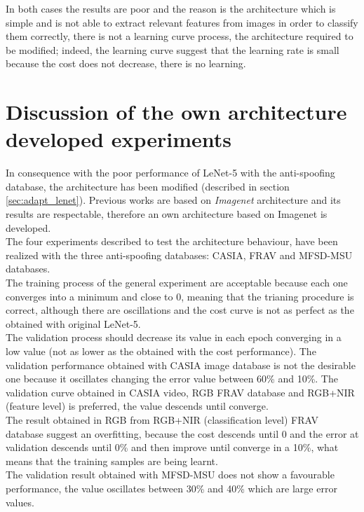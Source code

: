 In both cases the results are poor and the reason is the architecture which is simple and is not able to extract relevant features from images in order to classify them correctly, there is not a learning curve process, the architecture required to be modified; indeed, the learning curve suggest that the learning rate is small because the cost does not decrease, there is no learning.

\section{Discussion of the own architecture developed experiments}
In consequence with the poor performance of LeNet-5 with the anti-spoofing database, the architecture has been modified (described in section \ref{sec:adapt_lenet}). Previous works are based on \textit{Imagenet} architecture and its results are respectable, therefore an own architecture based on Imagenet is developed.\\

The four experiments described to test the architecture behaviour, have been realized with the three anti-spoofing databases: CASIA, FRAV and MFSD-MSU databases.\\

The training process of the general experiment are acceptable because each one converges into a minimum and close to 0, meaning that the trianing procedure is correct, although there are oscillations and the cost curve is not as perfect as the obtained with original LeNet-5.\\

The validation process should decrease its value in each epoch converging in a low value (not as lower as the obtained with the cost performance). The validation performance obtained with CASIA image database is not the desirable one because it oscillates changing the error value between 60\% and 10\%. The validation curve obtained in CASIA video, RGB FRAV database and RGB+NIR (feature level) is preferred, the value descends until converge.\\

The result obtained in RGB from RGB+NIR (classification level) FRAV database suggest an overfitting, because the cost descends until 0 and the error at validation descends until 0\% and then improve until converge in a 10\%, what means that the training samples are being learnt.\\

The validation result obtained with MFSD-MSU does not show a favourable performance, the value oscillates between 30\% and 40\% which are large error values.\\

